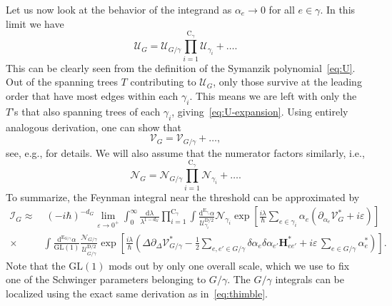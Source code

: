 \documentclass[12pt]{article}
\numberwithin{figure}{section}
\def \be {\begin{equation}}
\def \ee {\end{equation}}
\def \nn {\nonumber}
\def \CC {C}
\def \D {\mathrm{D}}
\def \E {\mathrm{E}}
\def \U {\mathcal{U}}
\def \d {\mathrm{d}}
\def \eps {\varepsilon}
\def \V {\mathcal{V}}
\def \CC {\mathrm{C}}
\def \I {\mathcal{I}}
\def \GL {\mathrm{GL}}
\def \N {\mathcal{N}}
\begin{document}
				Let us now look at the behavior of the integrand as $\alpha_e \to 0$ for all $e \in \gamma$. In this limit we have
                \be\label{eq:U-expansion}
                \U_G = \U_{G/\gamma} \prod_{i=1}^{\CC_\gamma} \U_{\gamma_i} + \ldots.
                \ee
				This can be clearly seen from the definition of the Symanzik polynomial~\eqref{eq:U}. Out of the spanning trees $T$ contributing to $\U_G$, only those survive at the leading order that have most edges within each $\gamma_i$. This means we are left with only the $T$'s that also spanning trees of each $\gamma_i$, giving~\eqref{eq:U-expansion}. Using entirely analogous derivation, one can show that
				\be\label{eq:VG}
				\V_G = \V_{G/\gamma} + \ldots,
				\ee
				see, e.g., \cite[Sec.~4.2]{Mizera:2021icv} for details.
				We will also assume that the numerator factors similarly, i.e.,
                \be
                \N_G = \N_{G/\gamma} \prod_{i=1}^{\CC_\gamma} \N_{\gamma_i} + \ldots.
                \ee
                To summarize, the Feynman integral near the threshold can be approximated by
	            \begin{align}\label{eq:IG-subleading}
            	\I_G \approx &\; (-i\hbar)^{-d_G} \!\!\lim_{\eps\to0^+} \int_0^\infty \frac{\d\lambda}{\lambda^{1-d_G}} \prod_{i=1}^{\CC_\gamma} \int \frac{\d^{\E_{\gamma_i}}\alpha}{\U_{\gamma_i}^{\D/2}} \N_{\gamma_i} \exp \left[{\frac{i\lambda}{\hbar} \sum_{e \in \gamma_i} \alpha_e(\partial_{\alpha_e} \V_{G}^\ast {+} i\eps)}\right]\\
            	\times & \int \frac{\d^{\E_{G/\gamma}} \alpha}{\GL(1)} \frac{\N_{G/\gamma}}{\U_{G/\gamma}^{\D/2}} \exp \left[ \frac{i\lambda}{\hbar}\left( \Delta \partial_\Delta \V_{G/\gamma}^\ast - \frac{1}{2} \sum_{e,e' \in G/\gamma} \delta\alpha_e \delta\alpha_{e'} \mathbf{H}_{ee'}^\ast + i\eps\, \sum_{e \in G/\gamma} \alpha_e^\ast\right)\right].\nn
            	\end{align}
            	Note that the $\GL(1)$ mods out by only one overall scale, which we use to fix one of the Schwinger parameters belonging to $G/\gamma$. The $G/\gamma$ integrals can be localized using the exact same derivation as in~\eqref{eq:thimble}.
                
\end{document}
